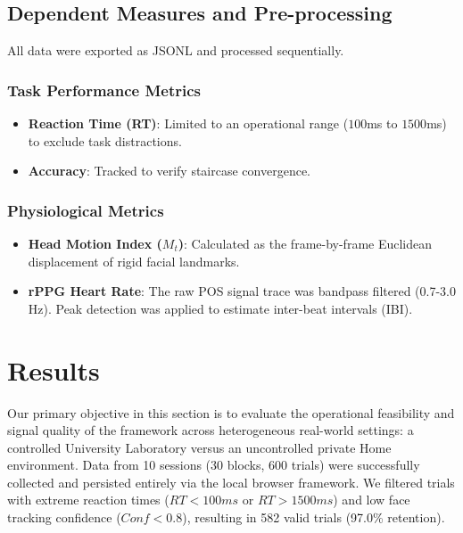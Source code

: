 \documentclass[final,3p,times,twocolumn]{elsarticle}
\begin{document}
\subsection{Dependent Measures and Pre-processing}
All data were exported as JSONL and processed sequentially.

\subsubsection{Task Performance Metrics}
\begin{itemize}
    \item \textbf{Reaction Time (RT)}: Limited to an operational range ($100$ms to $1500$ms) to exclude task distractions.
    \item \textbf{Accuracy}: Tracked to verify staircase convergence.
\end{itemize}

\subsubsection{Physiological Metrics}
\begin{itemize}
    \item \textbf{Head Motion Index ($M_t$)}: Calculated as the frame-by-frame Euclidean displacement of rigid facial landmarks.
    \item \textbf{rPPG Heart Rate}: The raw POS signal trace was bandpass filtered (0.7-3.0 Hz). 
Peak detection was applied to estimate inter-beat intervals (IBI).
\end{itemize}

\section{Results}

Our primary objective in this section is to evaluate the operational feasibility and signal quality of the framework across heterogeneous real-world settings: a controlled University Laboratory versus an uncontrolled private Home environment. 
Data from 10 sessions (30 blocks, 600 trials) were successfully collected and persisted entirely via the local browser framework.
We filtered trials with extreme reaction times ($RT < 100ms$ or $RT > 1500ms$) and low face tracking confidence ($Conf < 0.8$), resulting in 582 valid trials (97.0\% retention).
\end{document}
